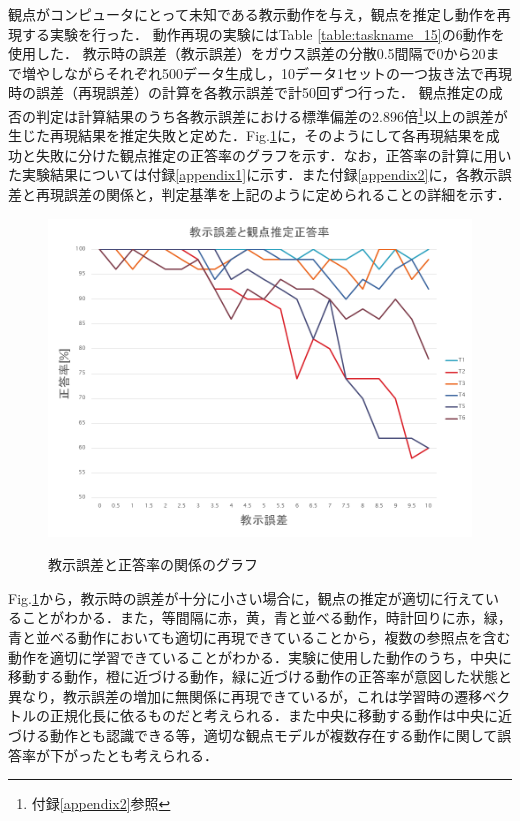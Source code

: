 観点がコンピュータにとって未知である教示動作を与え，観点を推定し動作を再現する実験を行った．
動作再現の実験にはTable \ref{table:taskname_15}の6動作を使用した．
教示時の誤差（教示誤差）をガウス誤差の分散0.5間隔で0から20まで増やしながらそれぞれ500データ生成し，10データ1セットの一つ抜き法で再現時の誤差（再現誤差）の計算を各教示誤差で計50回ずつ行った．
観点推定の成否の判定は計算結果のうち各教示誤差における標準偏差の2.896倍\footnote{付録\ref{appendix2}参照}以上の誤差が生じた再現結果を推定失敗と定めた．Fig.\ref{figure:success_rate}に，そのようにして各再現結果を成功と失敗に分けた観点推定の正答率のグラフを示す．なお，正答率の計算に用いた実験結果については付録\ref{appendix1}に示す．また付録\ref{appendix2}に，各教示誤差と再現誤差の関係と，判定基準を上記のように定められることの詳細を示す．
	\begin{figure}[h]
		\begin{center}
			\includegraphics[width=14cm]{chart2.png} \\ %
			\caption{教示誤差と正答率の関係のグラフ}
			\label{figure:success_rate}
		\end{center}
	\end{figure}

Fig.\ref{figure:success_rate}から，教示時の誤差が十分に小さい場合に，観点の推定が適切に行えていることがわかる．また，等間隔に赤，黄，青と並べる動作，時計回りに赤，緑，青と並べる動作においても適切に再現できていることから，複数の参照点を含む動作を適切に学習できていることがわかる．実験に使用した動作のうち，中央に移動する動作，橙に近づける動作，緑に近づける動作の正答率が意図した状態と異なり，教示誤差の増加に無関係に再現できているが，これは学習時の遷移ベクトルの正規化長に依るものだと考えられる．また中央に移動する動作は中央に近づける動作とも認識できる等，適切な観点モデルが複数存在する動作に関して誤答率が下がったとも考えられる．




